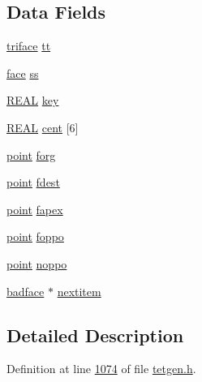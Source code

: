 \subsection*{Data Fields}
\begin{DoxyCompactItemize}
\item 
\hyperlink{classtetgenmesh_1_1triface}{triface} \hyperlink{classtetgenmesh_1_1badface_a01d24569e6058b3dae1a31e0638b849c}{tt}
\item 
\hyperlink{classtetgenmesh_1_1face}{face} \hyperlink{classtetgenmesh_1_1badface_ace098878b5e89ec387c959d8acd0153d}{ss}
\item 
\hyperlink{tetgen_8h_a4b654506f18b8bfd61ad2a29a7e38c25}{R\+E\+AL} \hyperlink{classtetgenmesh_1_1badface_ac94189eb4b728abd589597c89db9a1d7}{key}
\item 
\hyperlink{tetgen_8h_a4b654506f18b8bfd61ad2a29a7e38c25}{R\+E\+AL} \hyperlink{classtetgenmesh_1_1badface_a72958cf685f881af15213f0925ccf72a}{cent} \mbox{[}6\mbox{]}
\item 
\hyperlink{classtetgenmesh_ace3fb4f80389185b7c9b18ab69a3dea2}{point} \hyperlink{classtetgenmesh_1_1badface_a620b94f643bafaa7a4dbfeba7063a445}{forg}
\item 
\hyperlink{classtetgenmesh_ace3fb4f80389185b7c9b18ab69a3dea2}{point} \hyperlink{classtetgenmesh_1_1badface_a8e010478b28c997ad9b441d05df47695}{fdest}
\item 
\hyperlink{classtetgenmesh_ace3fb4f80389185b7c9b18ab69a3dea2}{point} \hyperlink{classtetgenmesh_1_1badface_a617348221ce387b323575110a5c79627}{fapex}
\item 
\hyperlink{classtetgenmesh_ace3fb4f80389185b7c9b18ab69a3dea2}{point} \hyperlink{classtetgenmesh_1_1badface_a8e9966e480c210ac83ab0a4c221a7000}{foppo}
\item 
\hyperlink{classtetgenmesh_ace3fb4f80389185b7c9b18ab69a3dea2}{point} \hyperlink{classtetgenmesh_1_1badface_ada4ec358fcf9261b2f14cff307e66fdf}{noppo}
\item 
\hyperlink{classtetgenmesh_1_1badface}{badface} $\ast$ \hyperlink{classtetgenmesh_1_1badface_ae87a801b03dbaa3dd5709ffed5eef5bc}{nextitem}
\end{DoxyCompactItemize}


\subsection{Detailed Description}


Definition at line \hyperlink{tetgen_8h_source_l01074}{1074} of file \hyperlink{tetgen_8h_source}{tetgen.\+h}.



